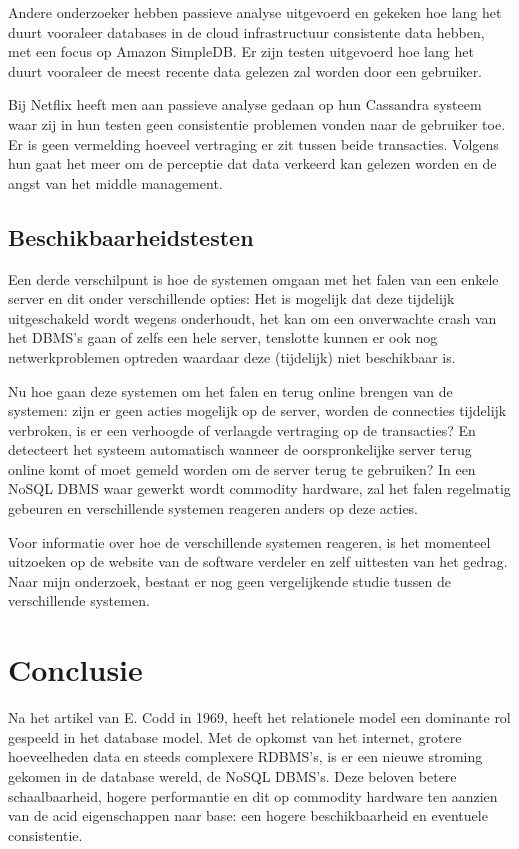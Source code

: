 Andere onderzoeker\cite{wada2011data} hebben passieve analyse uitgevoerd en gekeken hoe lang het duurt vooraleer databases in de cloud infrastructuur consistente data hebben, met een focus op Amazon SimpleDB. Er zijn testen uitgevoerd hoe lang het duurt vooraleer de meest recente data gelezen zal worden door een gebruiker. 

Bij Netflix heeft men aan passieve analyse gedaan op hun Cassandra systeem \cite{kalantzisnetflix} waar zij in hun testen geen consistentie problemen vonden naar de gebruiker toe. Er is geen vermelding hoeveel vertraging er zit tussen beide transacties. Volgens hun gaat het meer om de perceptie dat data verkeerd kan gelezen worden en de angst van het middle management. 

\subsection{Beschikbaarheidstesten}
Een derde verschilpunt is hoe de systemen omgaan met het falen van een enkele server en dit onder verschillende opties: Het is mogelijk dat deze tijdelijk uitgeschakeld wordt wegens onderhoudt, het kan om een onverwachte crash van het DBMS's gaan of zelfs een hele server, tenslotte kunnen er ook nog netwerkproblemen optreden waardaar deze (tijdelijk) niet beschikbaar is. 

Nu hoe gaan deze systemen om het falen en terug online brengen van de systemen: zijn er geen acties mogelijk op de server, worden de connecties tijdelijk verbroken, is er een verhoogde of verlaagde vertraging op de transacties? En detecteert het systeem automatisch wanneer de oorspronkelijke server terug online komt of moet gemeld worden om de server terug te gebruiken? In een NoSQL DBMS waar gewerkt wordt commodity hardware, zal het falen regelmatig gebeuren en verschillende systemen reageren anders op deze acties. 

Voor informatie over hoe de verschillende systemen reageren, is het momenteel uitzoeken op de website van de software verdeler en zelf uittesten van het gedrag. Naar mijn onderzoek, bestaat er nog geen vergelijkende studie tussen de verschillende systemen. 

\section{Conclusie}
Na het artikel van E. Codd \cite{Codd:1970:RMD:362384.362685} in 1969, heeft het relationele model een dominante rol gespeeld in het database model. Met de opkomst van het internet, grotere hoeveelheden data en steeds complexere RDBMS's, is er een nieuwe stroming gekomen in de database wereld, de NoSQL DBMS's. Deze beloven betere schaalbaarheid, hogere performantie en dit op commodity hardware ten aanzien van de \gls{acid} eigenschappen naar \gls{base}: een hogere beschikbaarheid en eventuele consistentie.  

